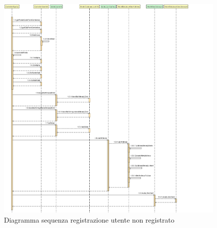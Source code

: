 \documentclass[a4paper,11pt]{report}
\begin{document}
\clearpage
\begin{figure}[h!]
    	\centering
    	\hspace*{-0.4in}
    	\includegraphics[width=1.3\linewidth]{Sequence diagrams/1 Registered user/signUp.png}
    	\caption{Diagramma sequenza registrazione utente non registrato}
    \end{figure}
\end{document}
